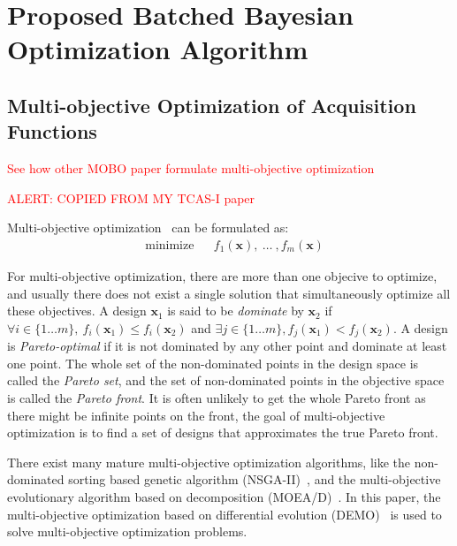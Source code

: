 \section{Proposed Batched Bayesian Optimization Algorithm}

\subsection{Multi-objective Optimization of Acquisition Functions}\label{sec:MOForumlation}

\textcolor{red}{See how other MOBO paper formulate multi-objective optimization}

\textcolor{red}{ALERT: COPIED FROM MY TCAS-I paper}

Multi-objective optimization~\cite{MO_overview} can be formulated as:
\begin{equation}
    \label{eq:MOFormulation}
    \begin{aligned}
        & \text{minimize} & & f_1(\bm{x}),~\dots~,f_m(\bm{x})
    \end{aligned}
\end{equation}

For multi-objective optimization, there are more than one objecive to optimize, and usually there does not exist a single solution that simultaneously optimize all these objectives. A design $\bm{x}_1$ is said to be \emph{dominate} by $\bm{x}_2$ if $\forall i \in \{1\dots m\},~f_i(\bm{x}_1) \le f_i(\bm{x}_2)$ and $\exists j \in \{1\dots m\}, f_j(\bm{x}_1) < f_j(\bm{x}_2)$. A design is \emph{Pareto-optimal} if it is not dominated by any other point and dominate at least one point. The whole set of the non-dominated points in the design space is called the \emph{Pareto set}, and the set of non-dominated points in the objective space is called the \emph{Pareto front}. It is often unlikely to get the whole Pareto front as there might be infinite points on the front, the goal of multi-objective optimization is to find a set of designs that approximates the true Pareto front.

There exist many mature multi-objective optimization algorithms, like the non-dominated sorting based genetic algorithm (NSGA-II)~\cite{nsgaii}, and the multi-objective evolutionary algorithm based on decomposition (MOEA/D)~\cite{moead}. In this paper, the multi-objective optimization based on differential evolution (DEMO)~\cite{demo} is used to solve multi-objective optimization problems.



